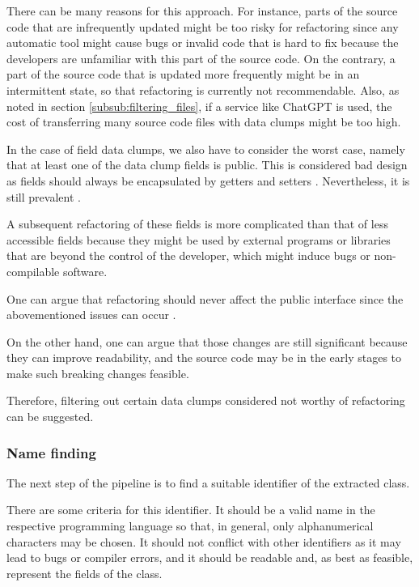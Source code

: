There can be many reasons for this approach. For instance, parts of the source code that are infrequently updated might be too risky for refactoring since any automatic tool might cause bugs or invalid code that is hard to fix because the developers are unfamiliar with this part of the source code. On the contrary, a part of the source code that is updated more frequently might be in an intermittent state, so that refactoring is currently not recommendable. Also, as noted in section  \ref{subsub:filtering_files}, if a service like ChatGPT is used, the cost of transferring many source code files with data clumps might be too high. 

In the case of field data clumps, we also have to consider the worst case, namely that at least one of the data clump fields is public. This is considered bad design as fields should always be encapsulated by getters and setters \cite{5680918}. Nevertheless, it is still prevalent \cite{5076631}.

A subsequent refactoring of these fields is more complicated than that of less accessible fields because they might be used by external programs or libraries that are beyond the control of the developer, which might induce bugs or non-compilable software. 

One can argue that refactoring should never affect the public interface since the abovementioned issues can occur \cite{10.1145/1352678.1352681}.

On the other hand, one can argue that those changes are still significant because they can improve readability, and the source code may be in the early stages to make such breaking changes feasible. 

Therefore, filtering out certain data clumps considered not worthy of refactoring can be suggested.

\subsubsection{Name finding}\label{subsec:chap3_data_clump_name_finding}
The next step of the pipeline is to find a suitable identifier of the extracted class.

There are some criteria for this identifier. It should be a valid name in the respective programming language so that, in general, only alphanumerical characters may be chosen. It should not conflict with other identifiers as it may lead to bugs or compiler errors, and it should be readable and, as best as feasible, represent the fields of the class.

